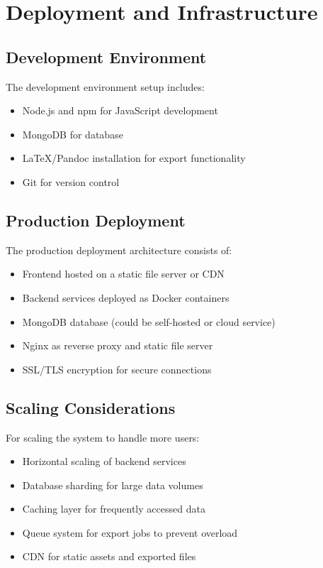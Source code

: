 \documentclass[12pt,a4paper]{book}
\begin{document}
\chapter{Deployment and Infrastructure}

\section{Development Environment}

The development environment setup includes:

\begin{itemize}
  \item Node.js and npm for JavaScript development
  \item MongoDB for database
  \item LaTeX/Pandoc installation for export functionality
  \item Git for version control
\end{itemize}

\section{Production Deployment}

The production deployment architecture consists of:

\begin{itemize}
  \item Frontend hosted on a static file server or CDN
  \item Backend services deployed as Docker containers
  \item MongoDB database (could be self-hosted or cloud service)
  \item Nginx as reverse proxy and static file server
  \item SSL/TLS encryption for secure connections
\end{itemize}

\section{Scaling Considerations}

For scaling the system to handle more users:

\begin{itemize}
  \item Horizontal scaling of backend services
  \item Database sharding for large data volumes
  \item Caching layer for frequently accessed data
  \item Queue system for export jobs to prevent overload
  \item CDN for static assets and exported files
\end{itemize}
\end{document}

